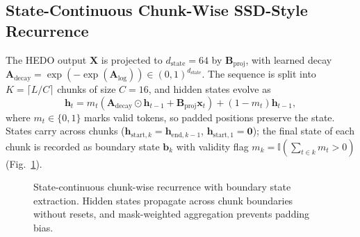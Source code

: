 \documentclass[runningheads,a4paper]{llncs}
\begin{document}
\subsection{State-Continuous Chunk-Wise SSD-Style Recurrence}
The HEDO output $\mathbf{X}$ is projected to $d_{\text{state}} = 64$ by $\mathbf{B}_{\text{proj}}$, with learned decay $\mathbf{A}_{\text{decay}} = \exp(-\exp(\mathbf{A}_{\text{log}})) \in (0, 1)^{d_{\text{state}}}$. The sequence is split into $K = \lceil L / C \rceil$ chunks of size $C = 16$, and hidden states evolve as
\begin{equation}
\mathbf{h}_{t} = m_t \left( \mathbf{A}_{\text{decay}} \odot \mathbf{h}_{t-1} + \mathbf{B}_{\text{proj}} \mathbf{x}_t \right) + (1 - m_t) \mathbf{h}_{t-1},
\end{equation}
where $m_t \in \{0, 1\}$ marks valid tokens, so padded positions preserve the state. States carry across chunks ($\mathbf{h}_{\text{start}, k} = \mathbf{h}_{\text{end}, k-1}$, $\mathbf{h}_{\text{start}, 1} = \mathbf{0}$); the final state of each chunk is recorded as boundary state $\mathbf{b}_k$ with validity flag $m_k = \mathbb{I}(\sum_{t \in k} m_t > 0)$ (Fig.~\ref{fig:chunk_recurrence}).

\begin{figure}[!htbp]
\centering
\resizebox{0.9\textwidth}{!}{\HEDOChunkFigure}
\caption{State-continuous chunk-wise recurrence with boundary state extraction. Hidden states propagate across chunk boundaries without resets, and mask-weighted aggregation prevents padding bias.}
\label{fig:chunk_recurrence}
\end{figure}
\end{document}
